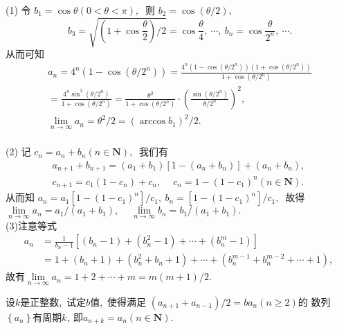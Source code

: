 	\begin{solution}
		(1) 令  $b_{1}=\cos \theta(0<\theta<\pi) ,\ $ 则  $b_{2}=\cos (\theta / 2) ,\ $
		$$b_{3}=\sqrt{\left(1+\cos \frac{\theta}{2}\right) / 2}=\cos \frac{\theta}{4},\  \cdots,\  b_{n}=\cos \frac{\theta}{2^{n}},\  \cdots .$$
		从而可知
		$$\begin{array}{c}
			a_{n}=4^{n}\left(1-\cos \left(\theta / 2^{n}\right)\right)=\frac{4^{n}\left(1-\cos \left(\theta / 2^{n}\right)\right)\left(1+\cos \left(\theta / 2^{n}\right)\right)}{1+\cos \left(\theta / 2^{n}\right)} \\
			=\frac{4^{n} \sin ^{2}\left(\theta / 2^{n}\right)}{1+\cos \left(\theta / 2^{n}\right)}=\frac{\theta^{2}}{1+\cos \left(\theta / 2^{n}\right)} \cdot\left(\frac{\sin \left(\theta / 2^{n}\right)}{\theta / 2^{n}}\right)^{2},\  \\
			\lim\limits_{n \rightarrow \infty} a_{n}=\theta^{2} / 2=\left(\arccos b_{1}\right)^{2} / 2 .
		\end{array}$$\\
		(2) 记  $c_{n}=a_{n}+b_{n}(n \in \mathbf{N}) ,\ $ 我们有
		$$\begin{array}{c}
			a_{n+1}+b_{n+1}=\left(a_{1}+b_{1}\right)\left[1-\left(a_{n}+b_{n}\right)\right]+\left(a_{n}+b_{n}\right),\  \\
			c_{n+1}=c_{1}\left(1-c_{n}\right)+c_{n},\  \quad c_{n}=1-\left(1-c_{1}\right)^{n}(n \in \mathbf{N}) .
		\end{array}$$
		从而知  $a_{n}=a_{1}\left[1-\left(1-c_{1}\right)^{n}\right] / c_{1},\  b_{n}=\left[1-\left(1-c_{1}\right)^{n}\right] / c_{1} ,\ $ 故得
		$\lim\limits_{n \rightarrow \infty} a_{n}=a_{1} /\left(a_{1}+b_{1}\right),\  \quad \lim\limits_{n \rightarrow\infty} b_{n}=b_1 /\left(a_{1}+b_{1}\right) .$\\
		(3)注意等式
		$$\begin{aligned}
			a_{n}&=\frac{1}{b_{n}-1}\left[\left(b_{n}-1\right)+\left(b_{n}^{2}-1\right)+\cdots+\left(b_{n}^{m}-1\right)\right]\\
			&=1+(b_n+1)+(b^2_n+b_n+1)+\cdots+(b^{m-1}_n+b^{m-2}_n+\cdots+1),\ 
		\end{aligned}$$
		故有$\lim\limits_{n\rightarrow\infty}a_n=1+2+\cdots+m=m(m+1)/2.$ 
	\end{solution}
	\newpage
	\begin{problem}
		设$  k  $是正整数,\  试定$  b  $值,\  使得满足  $\left(a_{n+1}+a_{n-1}\right) / 2=b a_{n}(n \geqslant 2)  $的 数列  $\left\{a_{n}\right\}  $有周期$  k ,\  $即$  a_{n + k}=a_{n}(n \in \mathbf{N}) .$
	\end{problem}
	
